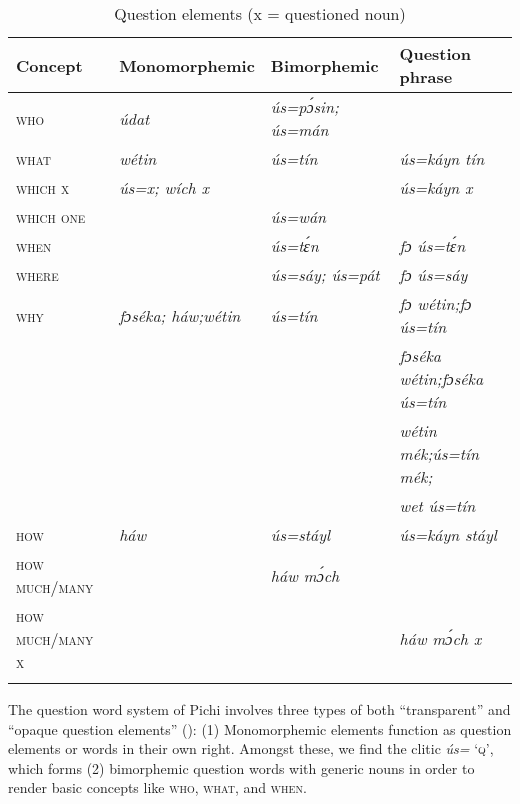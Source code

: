 \begin{table}
\caption{Question elements (x = questioned noun)}
\label{tab:key:7.4}

\begin{tabularx}{\textwidth}{lXXX}
\lsptoprule

Concept & Monomorphemic & Bimorphemic & Question phrase\\
\midrule
\textsc{who} & \itshape údat & \itshape ús=pɔ́sin; ús=mán & \\
\textsc{what} & \itshape wétin & \itshape ús=tín & \itshape ús=káyn tín \\
\textsc{which} \textsc{x} & \itshape ús=x; wích x &  & \itshape ús=káyn x\\
\textsc{which} \textsc{one} &  & \itshape ús=wán & \\
\textsc{when} &  & \itshape ús=tɛ́n & \itshape fɔ ús=tɛ́n\\
\textsc{where} &  & \itshape ús=sáy; ús=pát & \itshape fɔ ús=sáy\\
\textsc{why} & \itshape fɔséka; háw;\newline wétin & \itshape ús=tín & \itshape fɔ wétin;\newline fɔ ús=tín \\
&  &  & \itshape fɔséka wétin;\newline fɔséka ús=tín \\
&  &  & \itshape wétin mék;\newline ús=tín mék; \\
&  &  & \itshape wet ús=tín \\
\textsc{how} & \itshape háw & \itshape ús=stáyl & \itshape ús=káyn stáyl \\
\textsc{how} \textsc{much/many} &  & \itshape háw mɔ́ch & \\
\textsc{how} \textsc{much/many} \textsc{x} &  &  & \itshape háw mɔ́ch x\\
\lspbottomrule
\end{tabularx}
\end{table}

The question word system of Pichi involves three types of both “transparent” and “opaque question elements” (\citealt{MuyskenSmith1990}): (1) Monomorphemic elements function as question elements or words in their own right. Amongst these, we find the clitic \textit{ús=} ‘\textsc{q}’, which forms (2) bimorphemic question words with generic nouns in order to render basic concepts like \textsc{who,} \textsc{what,} and \textsc{when.}

